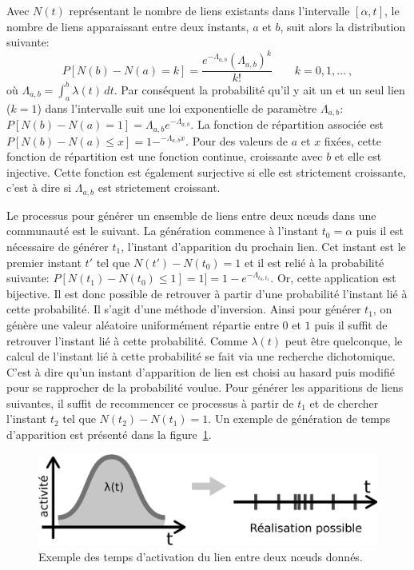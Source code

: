\bigskip

Avec $N(t)$ représentant le nombre de liens existants dans l'intervalle $[\alpha,t]$, le nombre de liens apparaissant entre deux instants, $a$ et $b$, suit alors la distribution suivante:
\begin{equation}
P [N(b) - N(a) = k] = \frac{e^{-\Lambda_{a,b}} (\Lambda_{a,b})^k}{k!} \qquad k= 0,1,\ldots \ ,
\end{equation}
où $\Lambda_{a,b}=\int_a^b \lambda(t)\,dt$.
Par conséquent la probabilité qu'il y ait un et un seul lien ($k=1$) dans l'intervalle suit une loi exponentielle de paramètre $\Lambda_{a,b}$: $P [N(b) - N(a) = 1]=\Lambda_{a,b}e^{-\Lambda_{a,b}}$.
La fonction de répartition associée est $P [N(b) - N(a) \leq x]= 1 - ^{-\Lambda_{a,b}x}$.
Pour des valeurs de $a$ et $x$ fixées, cette fonction de répartition est une fonction continue, croissante avec $b$ et elle est injective.
Cette fonction est également surjective si elle est strictement croissante, c'est à dire si $\Lambda_{a,b}$ est strictement croissant.

Le processus pour générer un ensemble de liens entre deux n\oe uds dans une communauté est le suivant.
La génération commence à l'instant $t_0=\alpha$ puis il est nécessaire de générer $t_1$, l'instant d'apparition du prochain lien.
Cet instant est le premier instant $t'$ tel que $N(t')- N(t_0)=1$ et il est relié à la probabilité suivante: $P [N(t_1) - N(t_0) \leq 1] = 1]=1-e^{-\Lambda_{t_0,t_1}}$.
Or, cette application est bijective.
Il est donc possible de retrouver à partir d'une probabilité l'instant lié à cette probabilité.
Il s'agit d'une méthode d'inversion.
Ainsi pour générer $t_1$, on génère une valeur aléatoire uniformément répartie entre $0$ et $1$ puis il suffit de retrouver l'instant lié à cette probabilité.
Comme $\lambda(t)$ peut être quelconque, le calcul de l'instant lié à cette probabilité se fait via une recherche dichotomique.
C'est à dire qu'un instant d'apparition de lien est choisi au hasard puis modifié pour se rapprocher de la probabilité voulue.
Pour générer les apparitions de liens suivantes, il suffit de recommencer ce processus à partir de $t_1$ et de chercher l'instant $t_2$ tel que $N(t_2)- N(t_1)=1$.
Un exemple de génération de temps d'apparition est présenté dans la figure~\ref{fig:qualite_Activation}.


\begin{figure}
\centering
\includegraphics[width=0.6\linewidth]{img/Qualite/Activation}
\caption{Exemple des temps d'activation du lien entre deux n\oe uds donnés.}
\label{fig:qualite_Activation}
\end{figure}


